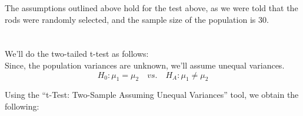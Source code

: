 \documentclass[letterpaper]{article}
\begin{document}
The assumptions outlined above hold for the test above, as we were told that the
rods were randomly selected, and the sample size of the population is 30.

\section{}%

\subsection{}%

We'll do the two-tailed t-test as follows:\\
Since, the population variances are unknown, we'll assume unequal variances.
$$H_0: \mu_1 = \mu_2 \quad vs. \quad H_A: \mu_1 \neq \mu_2 $$


Using the ``t-Test: Two-Sample Assuming Unequal Variances'' tool, we obtain the following:
\end{document}
